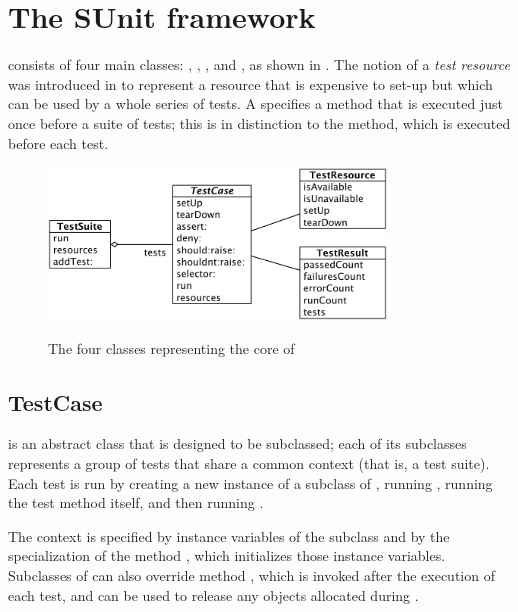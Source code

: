 \documentclass[a4paper,10pt,twoside]{book}
\begin{document}
\section{The SUnit framework}

\sunit consists of four main classes: ,
, , and , as shown in .
The notion of a \emph{test resource} was introduced in  to represent a resource that is expensive to set-up but which can be used by
a whole series of tests.  A 
specifies a  method that is executed just once before a suite of tests;
this is in distinction to the  method, which is executed before
each test.

\begin{figure}[htb]
  \begin{center}
		{\includegraphics[width=0.8\textwidth]{sunit-classes}}
	\caption{The four classes representing the core of \SUnit}
  \end{center}
\end{figure}


\subsection{TestCase}

 is an abstract class that is designed to be subclassed; each of its subclasses represents a group of tests that share a common context (that is, a test suite).
Each test is run by creating a new instance of a subclass of ,
running , running the test method itself, and then running .

The context is specified
by instance variables of the subclass
and by the specialization of the method
, which initializes those instance variables.
Subclasses of  can also override method
, which is invoked after the execution of each test,
and can be used to release any objects
allocated during .
\end{document}
